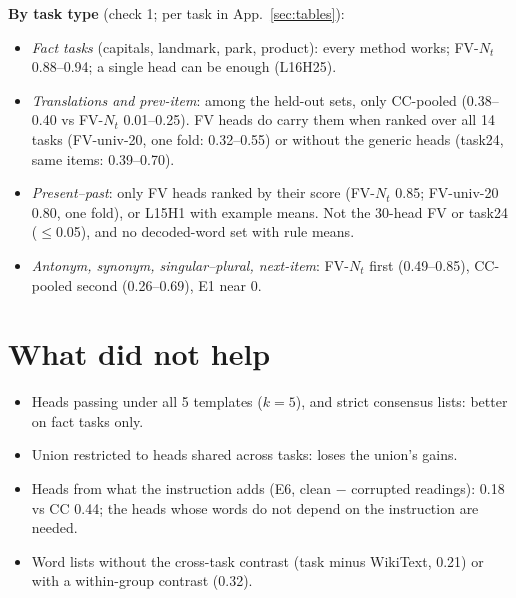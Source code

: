 \documentclass[10pt,a4paper]{article}
\newcommand{\no}{\textcolor{red!70!black}{\ding{55}}}
\begin{document}
\textbf{By task type} (check 1; per task in App.~\ref{sec:tables}):
\begin{itemize}
\item \emph{Fact tasks} (capitals, landmark, park, product): every method works; FV-$N_t$ 0.88--0.94; a single head can be enough (L16H25).
\item \emph{Translations and prev-item}: among the held-out sets, only CC-pooled (0.38--0.40 vs FV-$N_t$ 0.01--0.25). FV heads do carry them when ranked over all 14 tasks (FV-univ-20, one fold: 0.32--0.55) or without the generic heads (task24, same items: 0.39--0.70).
\item \emph{Present--past}: only FV heads ranked by their score (FV-$N_t$ 0.85; FV-univ-20 0.80, one fold), or L15H1 with example means. Not the 30-head FV or task24 ($\leq$0.05), and no decoded-word set with rule means.
\item \emph{Antonym, synonym, singular--plural, next-item}: FV-$N_t$ first (0.49--0.85), CC-pooled second (0.26--0.69), E1 near 0.
\end{itemize}

\section{What did not help}
\begin{itemize}
\item \no{} Heads passing under all 5 templates ($k=5$), and strict consensus lists: better on fact tasks only.
\item \no{} Union restricted to heads shared across tasks: loses the union's gains.
\item \no{} Heads from what the instruction adds (E6, clean $-$ corrupted readings): 0.18 vs CC 0.44; the heads whose words do not depend on the instruction are needed.
\item \no{} Word lists without the cross-task contrast (task minus WikiText, 0.21) or with a within-group contrast (0.32).
\end{itemize}

\end{document}
